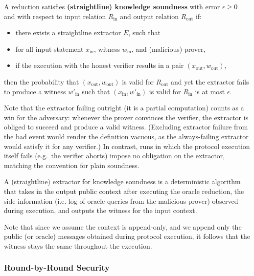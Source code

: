 \begin{definition}
    \label{def:knowledge_soundness}
    A reduction satisfies \textbf{(straightline) knowledge soundness} with error $\epsilon \geq 0$ and
    with respect to input relation $R_{\text{in}}$ and output relation $R_{\text{out}}$ if:
    \begin{itemize}
        \item there exists a straightline extractor $E$, such that
        \item for all input statement $x_{\text{in}}$, witness $w_{\text{in}}$, and (malicious) prover,
        \item if the execution with the honest verifier results in a pair $(x_{\text{out}}, w_{\text{out}})$,
    \end{itemize}
    then the probability that $(x_{\text{out}}, w_{\text{out}})$ is valid for $R_{\text{out}}$ and yet the extractor fails to produce a witness $w'_{\text{in}}$ such that $(x_{\text{in}}, w'_{\text{in}})$ is valid for $R_{\text{in}}$ is at most $\epsilon$.

    Note that the extractor failing outright (it is a partial computation) counts as a win for the adversary: whenever the prover convinces the verifier, the extractor is obliged to succeed and produce a valid witness. (Excluding extractor failure from the bad event would render the definition vacuous, as the always-failing extractor would satisfy it for any verifier.) In contrast, runs in which the protocol execution itself fails (e.g.\ the verifier aborts) impose no obligation on the extractor, matching the convention for plain soundness.

    A (straightline) extractor for knowledge soundness is a deterministic algorithm that takes in the output public context after executing the oracle reduction, the side information (i.e. log of oracle queries from the malicious prover) observed during execution, and outputs the witness for the input context.

    Note that since we assume the context is append-only, and we append only the public (or oracle)
    messages obtained during protocol execution, it follows that the witness stays the same throughout
    the execution.
\end{definition}

\subsubsection{Round-by-Round Security}

